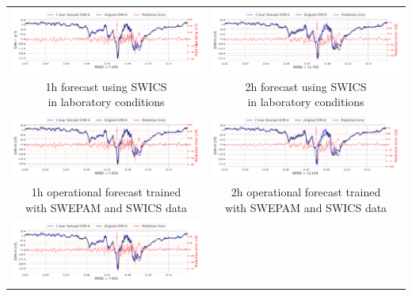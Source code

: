 \documentclass[draft,sw]{agutexSI2019}
\begin{document}
\begin{table}
\centering
\begin{tabular}{cc}
\includegraphics[width=0.49\linewidth]{paper_plots_shade/1h_swics/1h_swics_storm_27.png}
&
\includegraphics[width=0.49\linewidth]{paper_plots_shade/2h_swics/2h_swics_storm_27.png}
\\
\shortstack{1h forecast using SWICS\\ in laboratory conditions} & \shortstack{2h forecast using SWICS\\ in laboratory conditions}
\vspace*{12pt}
\\
\includegraphics[width=0.49\linewidth]{paper_plots_shade/1h_swics_rt/1h_swics_rt_storm_27.png}
&
\includegraphics[width=0.49\linewidth]{paper_plots_shade/2h_swics_rt/2h_swics_rt_storm_27.png}
\\
\shortstack{1h operational forecast trained\\ with SWEPAM and SWICS data} & \shortstack{2h operational forecast trained\\ with SWEPAM and SWICS data}
\vspace*{12pt}
\\
\includegraphics[width=0.49\linewidth]{paper_plots_shade/1h_swepam_rt/1h_swepam_rt_storm_27.png}

\end{tabular}
\end{table}
\end{document}
